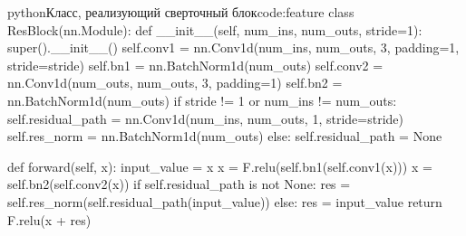 \begin{mintedbox}[]{python}{Класс, реализующий сверточный блок}{code:feature}
class ResBlock(nn.Module):
    def __init__(self, num_ins, num_outs, stride=1):
        super().__init__()
        self.conv1 = nn.Conv1d(num_ins, num_outs, 3, padding=1, stride=stride)
        self.bn1 = nn.BatchNorm1d(num_outs)
        self.conv2 = nn.Conv1d(num_outs, num_outs, 3, padding=1)
        self.bn2 = nn.BatchNorm1d(num_outs)
        if stride != 1 or num_ins != num_outs:
            self.residual_path = nn.Conv1d(num_ins, num_outs, 1, stride=stride)
            self.res_norm = nn.BatchNorm1d(num_outs)
        else:
            self.residual_path = None

    def forward(self, x):
        input_value = x
        x = F.relu(self.bn1(self.conv1(x)))
        x = self.bn2(self.conv2(x))
        if self.residual_path is not None:
            res = self.res_norm(self.residual_path(input_value))
        else:
            res = input_value
        return F.relu(x + res)
\end{mintedbox}
